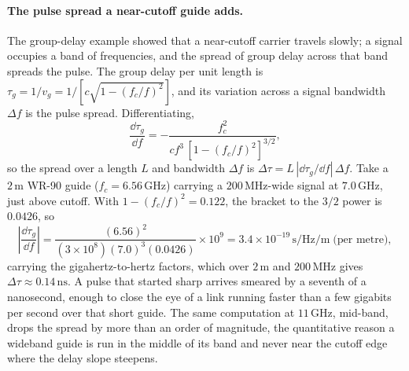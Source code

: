 \paragraph{The pulse spread a near-cutoff guide adds.}
The group-delay example showed that a near-cutoff carrier travels slowly;
a signal occupies a band of frequencies, and the spread of group delay
across that band spreads the pulse. The group delay per unit length is
$\tau_g = 1/v_g = 1/[c\sqrt{1-(f_c/f)^2}]$, and its variation across a
signal bandwidth $\Delta f$ is the pulse spread. Differentiating,
\[
\frac{\dd \tau_g}{\dd f} = -\frac{f_c^2}{c f^3\,[1-(f_c/f)^2]^{3/2}},
\]
so the spread over a length $L$ and bandwidth $\Delta f$ is $\Delta\tau =
L\,|\dd\tau_g/\dd f|\,\Delta f$. Take a $2\,\si{\meter}$ WR-90 guide
($f_c = 6.56\,\si{\giga\hertz}$) carrying a $200\,\si{\mega\hertz}$-wide
signal at $7.0\,\si{\giga\hertz}$, just above cutoff. With $1-(f_c/f)^2 =
0.122$, the bracket to the $3/2$ power is $0.0426$, so
\[
\left|\frac{\dd\tau_g}{\dd f}\right| = \frac{(6.56)^2}{(3\times 10^{8})
(7.0)^3(0.0426)}\times 10^{9} = 3.4\times 10^{-19}\,\si{\second\per\hertz
\per\meter}\;\text{(per metre)},
\]
carrying the gigahertz-to-hertz factors, which over $2\,\si{\meter}$ and
$200\,\si{\mega\hertz}$ gives $\Delta\tau \approx 0.14\,\si{\nano\second}$.
A pulse that started sharp arrives smeared by a seventh of a nanosecond,
enough to close the eye of a link running faster than a few gigabits per
second over that short guide. The same computation at $11\,\si{\giga
\hertz}$, mid-band, drops the spread by more than an order of magnitude,
the quantitative reason a wideband guide is run in the middle of its band
and never near the cutoff edge where the delay slope steepens.

